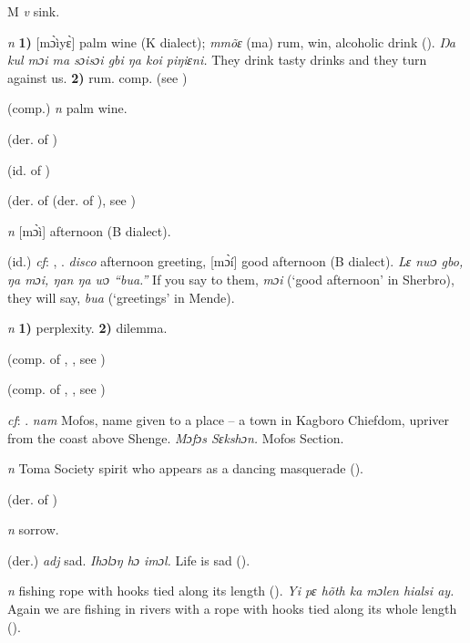 \begin{letter}{M}
 \textit{v} sink.

 \textit{n} \textbf{1)} [mɔ̀ìyɛ̀] palm wine (K dialect); \textit{mmõɛ} (ma) rum, win, alcoholic drink (\citealt{Pichl1967}). \textit{Ŋa kul mɔi ma sɔisɔi gbi ŋa koi piŋiɛni.} They drink tasty drinks and they turn against us. \textbf{2)} rum. comp.  (see ) 

 (comp.) \textit{n} palm wine.

 (der. of )

 (id. of ) 

 (der. of  (der. of ), see ) 

 \textit{n} [mɔ̀ì] afternoon (B dialect). 

 (id.) \textit{cf}: , . \textit{disco} afternoon greeting, [mɔ̀í] good afternoon (B dialect). \textit{Lɛ nwɔ gbo, ŋa mɔi, ŋan ŋa wɔ “bua.”} If you say to them, \textit{mɔi} (‘good afternoon' in Sherbro), they will say, \textit{bua} (‘greetings' in Mende).

 \textit{n} \textbf{1)} perplexity. \textbf{2)} dilemma.

 (comp. of , , see ) 

 (comp. of , , see ) 

 \textit{cf}: . \textit{nam} Mofos, name given to a place – a town in Kagboro Chiefdom, upriver from the coast above Shenge. \textit{Mɔfɔs Sɛkshɔn.} Mofos Section.

 \textit{n} Toma Society spirit who appears as a dancing masquerade (\citealt{Pichl1967}).

 (der. of ) 

 \textit{n} sorrow.

 (der.) \textit{adj} sad. \textit{Ihɔlɔŋ hɔ imɔl.} Life is sad (\citealt{Pichl1967}).

 \textit{n} fishing rope with hooks tied along its length (\citealt{Sumner1921}). \textit{Yi pɛ hõth ka mɔlen hialsi ay.} Again we are fishing in rivers with a rope with hooks tied along its whole length (\citealt{Pichl1967}). 


\end{letter}
